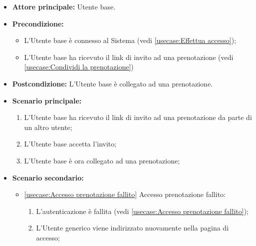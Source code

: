 \label{usecase:Accedi alla prenotazione}
\begin{itemize}
	\item \textbf{Attore principale:} Utente base.

	\item \textbf{Precondizione:} 
	\begin{itemize}
		\item L'Utente base è connesso al Sistema (vedi \autoref{usecase:Effettua accesso});
		\item L'Utente base ha ricevuto il link di invito ad una prenotazione (vedi \autoref{usecase:Condividi la prenotazione})
	\end{itemize}
		

	\item \textbf{Postcondizione:} L'Utente base è collegato ad una prenotazione.

	\item \textbf{Scenario principale:}
	      \begin{enumerate}
		      \item L'Utente base ha ricevuto il link di invito ad una prenotazione da parte di un altro utente;
		      \item L'Utente base accetta l'invito;
		      \item L'Utente base è ora collegato ad una prenotazione;
	      \end{enumerate}

	\item \textbf{Scenario secondario:}
		  \begin{itemize}
			  \item \autoref{usecase:Accesso prenotazione fallito} Accesso prenotazione fallito:
			  \begin{enumerate}
				  \item L'autenticazione è fallita (vedi \autoref{usecase:Accesso prenotazione fallito});
				  \item L'Utente generico viene indirizzato nuovamente nella pagina di accesso; 
			  \end{enumerate}	
		  \end{itemize}
\end{itemize}
